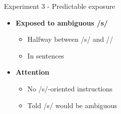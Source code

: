 \documentclass{beamer}
\begin{document}
\begin{frame}{Experiment 3 - Predictable exposure}

\begin{minipage}{0.45\textwidth}
\begin{itemize}
\item \textbf{Exposed to ambiguous /s/}
\begin{itemize}
\item Halfway between /s/ and /\textesh/
\item In sentences
\end{itemize}

\item \textbf{Attention}
\begin{itemize}
\item No /s/-oriented instructions
\item Told /s/ would be ambiguous
\end{itemize}


\end{itemize}
\end{minipage}
\end{frame}
\end{document}
